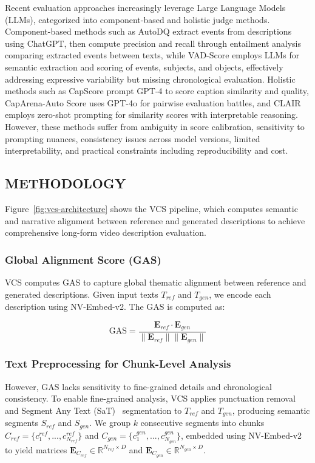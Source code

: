 \documentclass[main.tex]{subfiles}
\begin{document}
Recent evaluation approaches increasingly leverage Large Language Models (LLMs), categorized into component-based and holistic judge methods. Component-based methods such as AutoDQ \cite{wyzs:24} extract events from descriptions using ChatGPT, then compute precision and recall through entailment analysis comparing extracted events between texts, while VAD-Score employs LLMs for semantic extraction and scoring of events, subjects, and objects, effectively addressing expressive variability but missing chronological evaluation. Holistic methods such as CapScore prompt GPT-4 to score caption similarity and quality, CapArena-Auto Score uses GPT-4o for pairwise evaluation battles, and CLAIR \cite{chan:23} employs zero-shot prompting for similarity scores with interpretable reasoning. However, these methods suffer from ambiguity in score calibration, sensitivity to prompting nuances, consistency issues across model versions, limited interpretability, and practical constraints including reproducibility and cost.

\subsection{METHODOLOGY}
\label{sec:methodology_vcs}

Figure~\ref{fig:vcs-architecture} shows the VCS pipeline, which computes semantic and narrative alignment between reference and generated descriptions to achieve comprehensive long-form video description evaluation.

\subsubsection{Global Alignment Score (GAS)}
VCS computes GAS to capture global thematic alignment between reference and generated descriptions. Given input texts $T_{ref}$ and $T_{gen}$, we encode each description using NV-Embed-v2. The GAS is computed as:

\begin{equation} \label{eq:gas_revised}
\text{GAS} = \frac{\mathbf{E}_{ref} \cdot \mathbf{E}_{gen}}{\|\mathbf{E}_{ref}\| \|\mathbf{E}_{gen}\|}
\end{equation}

\subsubsection{Text Preprocessing for Chunk-Level Analysis}
However, GAS lacks sensitivity to fine-grained details and chronological consistency. To enable fine-grained analysis, VCS applies punctuation removal and Segment Any Text (SaT)~\cite{frohmann-etal-2024-segment} segmentation to $T_{ref}$ and $T_{gen}$, producing semantic segments $S_{ref}$ and $S_{gen}$. We group $k$ consecutive segments into chunks $C_{ref} = \{c_1^{ref}, ..., c_{N_{ref}}^{ref}\}$ and $C_{gen} = \{c_1^{gen}, ..., c_{N_{gen}}^{gen}\}$, embedded using NV-Embed-v2 to yield matrices $\mathbf{E}_{C_{ref}} \in \mathbb{R}^{N_{ref} \times D}$ and $\mathbf{E}_{C_{gen}} \in \mathbb{R}^{N_{gen} \times D}$.
\end{document}
